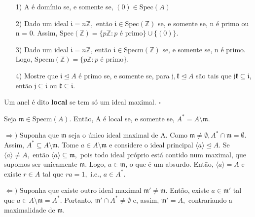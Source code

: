 \documentclass[AlgebraII/algebraII_notes.tex]{subfiles}
\begin{document}
\begin{prop*}[Exercício]
	\begin{itemize}
		\item[1)] A é domínio se, e somente se, \((0)\in \mathrm{Spec}(A)\)
		\item[2)] Dado um ideal \(\mathfrak{i} = n \mathbb{Z},\) então \(\mathfrak{i}\in \mathrm{Spec}(\mathbb{Z})\) se, e somente se,
		      n é primo ou n = 0. Assim, \(\mathrm{Spec}(\mathbb{Z}) = \{p \mathbb{Z}: p \text{ é primo}\}\cup \{(0)\}\).
		\item[3)] Dado um ideal \(\mathfrak{i} = n \mathbb{Z}\), então \(\mathfrak{i}\in \mathrm{Specm}(\mathbb{Z})\) se, e somente se,
		      n é primo. Logo, \(\mathrm{Specm}(\mathbb{Z}) = \{p \mathbb{Z}:p \text{ é primo}\}\).
		\item[4)] Mostre que \(\mathfrak{i}\trianglelefteq A\) é primo se, e somente se, para \(\mathfrak{j}, \mathfrak{k}\trianglelefteq A\) são tais que \(\mathfrak{j}\mathfrak{k}\subseteq \mathfrak{i}\), então
		      \(\mathfrak{j}\subseteq \mathfrak{i}\) ou \(\mathfrak{k}\subseteq \mathfrak{i}\).
	\end{itemize}
\end{prop*}
\begin{def*}
	Um anel é dito \textbf{local} se tem só um ideal maximal. \(\square\)
\end{def*}
\begin{lemma*}
	Seja \(\mathfrak{m}\in \mathrm{Specm}(A)\). Então, A é local se, e somente se, \(A^{*} = A\setminus{\mathfrak{m}}\).
\end{lemma*}
\begin{proof*}
	\(\Rightarrow )\) Suponha que \(\mathfrak{m}\) seja o único ideal maximal de A. Como \(\mathfrak{m} \neq\emptyset, A^{*}\cap \mathfrak{m} = \emptyset\).
	Assim, \(A^{*}\subseteq{A\setminus{\mathfrak{m}}}.\) Tome \(a\in A\setminus{\mathfrak{m}}\) e considere o ideal principal \(\langle a \rangle \trianglelefteq{A}.\)
	Se \(\langle a \rangle\neq A,\) então \(\langle a \rangle \subseteq{\mathfrak{m}},\) pois todo ideal próprio está contido num maximal, que supomos ser unicamente \(\mathfrak{m}\).
	Logo, \(a\in \mathfrak{m}\), o que é um absurdo. Então, \(\langle a \rangle = A\) e existe \(r\in A\) tal que \(ra = 1,\) i.e., \(a\in A^{*}.\)

	\(\Leftarrow )\) Suponha que existe outro ideal maximal \(\mathfrak{m}'\neq \mathfrak{m}.\) Então, existe \(a\in \mathfrak{m}'\)
	tal que \(a\in A\setminus{\mathfrak{m}} = A^{*}.\) Portanto, \(\mathfrak{m}'\cap A^{*} \neq\emptyset\) e, assim, \(\mathfrak{m}' = A,\)
	contrariando a maximalidade de \(\mathfrak{m}.\) \qedsymbol
\end{proof*}
\end{document}
